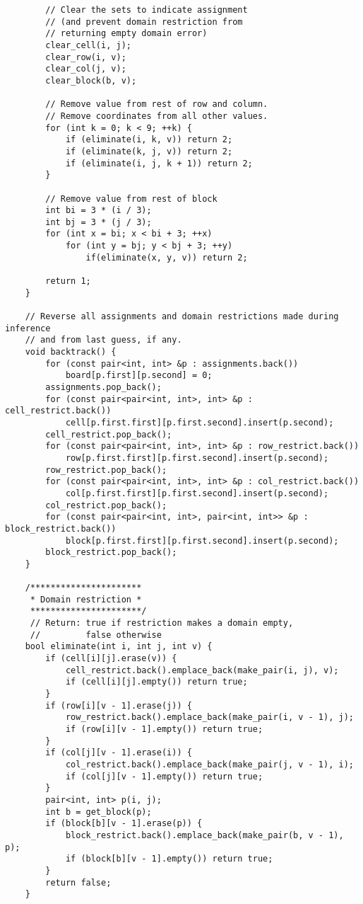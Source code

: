 \documentclass{article}
\begin{document}
\begin{lstlisting}
        // Clear the sets to indicate assignment
        // (and prevent domain restriction from
        // returning empty domain error)
        clear_cell(i, j);
        clear_row(i, v);
        clear_col(j, v);
        clear_block(b, v);

        // Remove value from rest of row and column.
        // Remove coordinates from all other values.
        for (int k = 0; k < 9; ++k) {
            if (eliminate(i, k, v)) return 2;
            if (eliminate(k, j, v)) return 2;
            if (eliminate(i, j, k + 1)) return 2;
        }

        // Remove value from rest of block
        int bi = 3 * (i / 3);
        int bj = 3 * (j / 3);
        for (int x = bi; x < bi + 3; ++x)
            for (int y = bj; y < bj + 3; ++y)
                if(eliminate(x, y, v)) return 2;

        return 1;
    }

    // Reverse all assignments and domain restrictions made during inference
    // and from last guess, if any.
    void backtrack() {
        for (const pair<int, int> &p : assignments.back())
            board[p.first][p.second] = 0;
        assignments.pop_back();
        for (const pair<pair<int, int>, int> &p : cell_restrict.back())
            cell[p.first.first][p.first.second].insert(p.second);
        cell_restrict.pop_back();
        for (const pair<pair<int, int>, int> &p : row_restrict.back())
            row[p.first.first][p.first.second].insert(p.second);
        row_restrict.pop_back();
        for (const pair<pair<int, int>, int> &p : col_restrict.back())
            col[p.first.first][p.first.second].insert(p.second);
        col_restrict.pop_back();
        for (const pair<pair<int, int>, pair<int, int>> &p : block_restrict.back())
            block[p.first.first][p.first.second].insert(p.second);
        block_restrict.pop_back();
    }

    /**********************
     * Domain restriction *
     **********************/
     // Return: true if restriction makes a domain empty,
     //         false otherwise
    bool eliminate(int i, int j, int v) {
        if (cell[i][j].erase(v)) {
            cell_restrict.back().emplace_back(make_pair(i, j), v);
            if (cell[i][j].empty()) return true;
        }
        if (row[i][v - 1].erase(j)) {
            row_restrict.back().emplace_back(make_pair(i, v - 1), j);
            if (row[i][v - 1].empty()) return true;
        }
        if (col[j][v - 1].erase(i)) {
            col_restrict.back().emplace_back(make_pair(j, v - 1), i);
            if (col[j][v - 1].empty()) return true;
        }
        pair<int, int> p(i, j);
        int b = get_block(p);
        if (block[b][v - 1].erase(p)) {
            block_restrict.back().emplace_back(make_pair(b, v - 1), p);
            if (block[b][v - 1].empty()) return true;
        }
        return false;
    }


\end{lstlisting}
\end{document}

